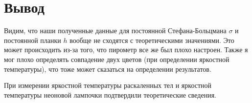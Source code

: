 \documentclass[a4paper, 12pt]{article}%
\begin{document}
\section{Вывод}

Видим, что наши полученные данные для постоянной Стефана-Больцмана $\sigma$ и постоянной планки $h$ вообще не сходятся с теоретическими значениями. Это может происходить из-за того, что пирометр все же был плохо настроен. Также я мог плохо определять совпадение двух цветов (при определении яркостной температуры), что тоже может сказаться на определении результатов.

При измерении яркостной температуры раскаленных тел и яркостной температуры неоновой лампочки подтвердили теоретические сведения.
\end{document}
